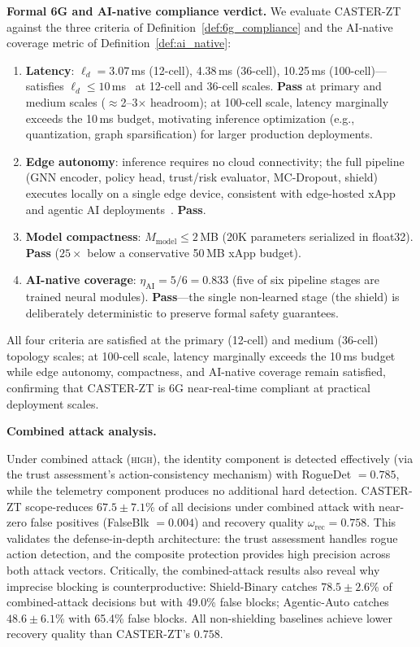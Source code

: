 \documentclass[10pt,journal,compsoc]{IEEEtran}
\begin{document}
\noindent\textbf{Formal 6G and AI-native compliance verdict.}
We evaluate CASTER-ZT against the three criteria of Definition~\ref{def:6g_compliance} and the AI-native coverage metric of Definition~\ref{def:ai_native}:
\begin{enumerate}
    \item \textbf{Latency}: $\ell_d = 3.07$\,ms (12-cell), 4.38\,ms (36-cell), 10.25\,ms (100-cell)---satisfies $\ell_d \le 10$\,ms~\cite{oran_ngrg_2024,dasilva2024xapp} at 12-cell and 36-cell scales. \textbf{Pass} at primary and medium scales ($\approx$2--3$\times$ headroom); at 100-cell scale, latency marginally exceeds the 10\,ms budget, motivating inference optimization (e.g., quantization, graph sparsification) for larger production deployments.
    \item \textbf{Edge autonomy}: inference requires no cloud connectivity; the full pipeline (GNN encoder, policy head, trust/risk evaluator, MC-Dropout, shield) executes locally on a single edge device, consistent with edge-hosted xApp and agentic AI deployments~\cite{raftopoulos2024drl,demichelis2025edge}. \textbf{Pass}.
    \item \textbf{Model compactness}: $M_{\mathrm{model}} \le 2$\,MB (20K parameters serialized in float32). \textbf{Pass} ($25\times$ below a conservative 50\,MB xApp budget).
    \item \textbf{AI-native coverage}: $\eta_{\mathrm{AI}} = 5/6 = 0.833$ (five of six pipeline stages are trained neural modules). \textbf{Pass}---the single non-learned stage (the shield) is deliberately deterministic to preserve formal safety guarantees.
\end{enumerate}
All four criteria are satisfied at the primary (12-cell) and medium (36-cell) topology scales; at 100-cell scale, latency marginally exceeds the 10\,ms budget while edge autonomy, compactness, and AI-native coverage remain satisfied, confirming that CASTER-ZT is 6G near-real-time compliant at practical deployment scales.

\noindent\textbf{Combined attack analysis.}

Under combined attack (\textsc{high}), the identity component is detected effectively (via the trust assessment's action-consistency mechanism) with RogueDet $= 0.785$, while the telemetry component produces no additional hard detection.
CASTER-ZT scope-reduces $67.5\pm7.1$\% of all decisions under combined attack with near-zero false positives (FalseBlk $= 0.004$) and recovery quality $\omega_{\mathrm{rec}} = 0.758$.
This validates the defense-in-depth architecture: the trust assessment handles rogue action detection, and the composite protection provides high precision across both attack vectors.
Critically, the combined-attack results also reveal why imprecise blocking is counterproductive: Shield-Binary catches $78.5\pm2.6$\% of combined-attack decisions but with 49.0\% false blocks; Agentic-Auto catches $48.6\pm6.1$\% with 65.4\% false blocks.
All non-shielding baselines achieve lower recovery quality than CASTER-ZT's $0.758$.
\end{document}
